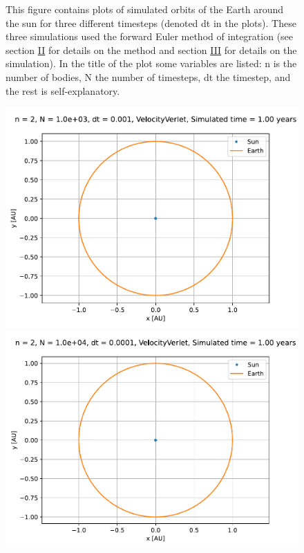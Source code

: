 \documentclass[reprint,english,notitlepage]{revtex4-1}  %
\begin{document}
\begin{figure}[H]
\caption{This figure contains plots of simulated orbits of the Earth around the sun for three different timesteps (denoted dt in the plots). These three simulations used the forward Euler method of integration (see section \hyperref[sec:II]{II} for details on the method and section \hyperref[sec:III]{III} for details on the simulation). In the title of the plot some variables are listed: n is the number of bodies, N the number of timesteps, dt the timestep, and the rest is self-explanatory.}
\label{fig:se-fe-orbits}
\end{figure}

\begin{figure}[H]
\includegraphics[scale=0.5]{../data/figures/sun-earth-3c/se_dt1e-3_vv_orbit2D.pdf}
\includegraphics[scale=0.5]{../data/figures/sun-earth-3c/se_dt1e-4_vv_orbit2D.pdf}

\end{figure}
\end{document}
